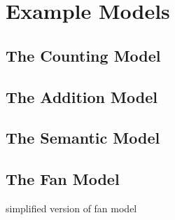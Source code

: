 \chapter{Example Models}

\section{The Counting Model}

\section{The Addition Model}

\section{The Semantic Model}

\section{The Fan Model}

simplified version of fan model